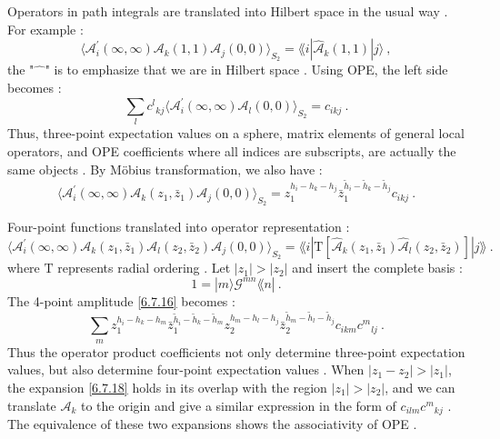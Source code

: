 Operators in path integrals are translated into Hilbert space in the usual way . For example :
\begin{equation}
	\bigl\langle\mathscr{A}_{i}^{\prime}(\infty, \infty) \mathscr{A}_{k}(1,1) \mathscr{A}_{j}(0,0)\bigr\rangle_{S_{2}}=
	\lAngle i|\hat{\mathscr{A}}_{k}(1,1)| j\rangle \:, \label{6.7.13}
\end{equation}
the "$\hat{\phantom{m}}$" is to emphasize that we are in Hilbert space . Using OPE, the left side becomes :
\begin{equation}
	\sum_{l} c^{l}{}_{kj}\bigl\langle\mathscr{A}_{i}^{\prime}(\infty, \infty) \mathscr{A}_{l}(0,0)\bigr\rangle_{S_{2}}=c_{i k j} \:. \label{6.7.14}
\end{equation}
Thus, three-point expectation values on a sphere, matrix elements of general local operators, and OPE coefficients where all indices are subscripts, are actually the same objects . By Möbius transformation, we also have :
\begin{equation}
	\bigl\langle\mathscr{A}_{i}^{\prime}(\infty, \infty) \mathscr{A}_{k}(z_{1}, \bar{z}_{1}) 
	\mathscr{A}_{j}(0,0)\bigr\rangle_{S_{2}} = z_{1}^{h_{i}-h_{k}-h_{j}} \bar{z}_{1}^{\tilde{h}_{i}-\tilde{h}_{k}-\tilde{h}_{j}} 
	c_{i k j} \:. \label{6.7.15}
\end{equation}

Four-point functions translated into operator representation :
\begin{equation}
	\bigl\langle\mathscr{A}_{i}^{\prime}(\infty, \infty) \mathscr{A}_{k}(z_{1}, \bar{z}_{1}) 
	\mathscr{A}_{l}(z_{2}, \bar{z}_{2}) \mathscr{A}_{j}(0,0)\bigr\rangle_{S_{2}} 
	=\lAngle i |\mathrm{T}[\hat{\mathscr{A}}_{k}(z_{1}, \bar{z}_{1}) \hat{\mathscr{A}}_{l}(z_{2}, \bar{z}_{2})]|j\rAngle \:. \label{6.7.16}
\end{equation}
where $\mathrm{T}$ represents radial ordering . Let $|z_{1}| > |z_{2}|$ and insert the complete basis :
\begin{equation}
	1=|m\rangle \mathscr{G}^{m n} \lAngle n| \:. \label{6.7.17}
\end{equation}
The 4-point amplitude \eqref{6.7.16} becomes :
\begin{equation}
	\sum_{m} z_{1}^{h_{i}-h_{k}-h_{m}} \bar{z}_{1}^{\tilde{h}_{i}-\tilde{h}_{k}-\tilde{h}_{m}} z_{2}^{h_{m}-h_{l}-h_{j}} 
	\bar{z}_{2}^{\tilde{h}_{m}-\tilde{h}_{l}-\tilde{h}_{j}} c_{i k m} c^{m}{}_{l j} \:. \label{6.7.18}
\end{equation}
Thus the operator product coefficients not only determine three-point expectation values, but also determine four-point expectation values . When $|z_{1}-z_{2}|>|z_{1}|$, the expansion \eqref{6.7.18} holds in its overlap with the region $|z_{1}|>|z_{2}|$, and we can translate $\mathscr{A}_{k}$ to the origin and give a similar expression in the form of $c_{i l m} c^{m}{}_{k j}$ . The equivalence of these two expansions shows the associativity of OPE .

